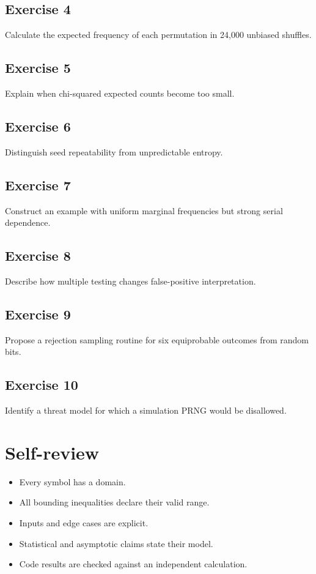 \documentclass[11pt,letterpaper]{article}
\begin{document}
\subsection{Exercise 4}\noindent Calculate the expected frequency of each permutation in 24,000 unbiased shuffles.
\subsection{Exercise 5}\noindent Explain when chi-squared expected counts become too small.
\subsection{Exercise 6}\noindent Distinguish seed repeatability from unpredictable entropy.
\subsection{Exercise 7}\noindent Construct an example with uniform marginal frequencies but strong serial dependence.
\subsection{Exercise 8}\noindent Describe how multiple testing changes false-positive interpretation.
\subsection{Exercise 9}\noindent Propose a rejection sampling routine for six equiprobable outcomes from random bits.
\subsection{Exercise 10}\noindent Identify a threat model for which a simulation PRNG would be disallowed.
\section{Self-review}
\begin{itemize}\item Every symbol has a domain.\item All bounding inequalities declare their valid range.\item Inputs and edge cases are explicit.\item Statistical and asymptotic claims state their model.\item Code results are checked against an independent calculation.\end{itemize}
\end{document}
